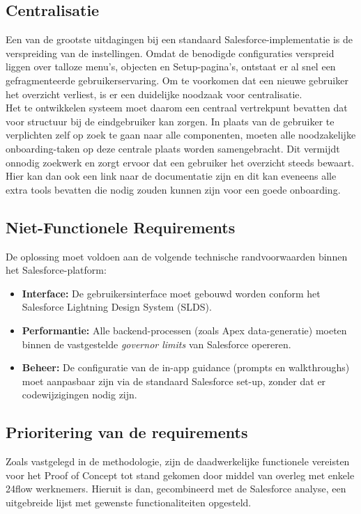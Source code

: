 \subsection{Centralisatie}
\label{subsec:centralisatie_dashboard}
Een van de grootste uitdagingen bij een standaard Salesforce-implementatie is de verspreiding van de instellingen. Omdat de benodigde configuraties verspreid liggen over talloze menu's, objecten en Setup-pagina's, ontstaat er al snel een gefragmenteerde gebruikerservaring. Om te voorkomen dat een nieuwe gebruiker het overzicht verliest, is er een duidelijke noodzaak voor centralisatie. 
\\

Het te ontwikkelen systeem moet daarom een centraal vertrekpunt bevatten dat voor structuur bij de eindgebruiker kan zorgen. In plaats van de gebruiker te verplichten zelf op zoek te gaan naar alle componenten, moeten alle noodzakelijke onboarding-taken op deze centrale plaats worden samengebracht. Dit vermijdt onnodig zoekwerk en zorgt ervoor dat een gebruiker het overzicht steeds bewaart. Hier kan dan ook een link naar de documentatie zijn en dit kan eveneens alle extra tools bevatten die nodig zouden kunnen zijn voor een goede onboarding.

\subsection{Niet-Functionele Requirements}
De oplossing moet voldoen aan de volgende technische randvoorwaarden binnen het Salesforce-platform:

\begin{itemize}
	\item \textbf{Interface:} De gebruikersinterface moet gebouwd worden conform het Salesforce Lightning Design System (SLDS).
	\item \textbf{Performantie:} Alle backend-processen (zoals Apex data-generatie) moeten binnen de vastgestelde \textit{governor limits} van Salesforce opereren.
	\item \textbf{Beheer:} De configuratie van de in-app guidance (prompts en walkthroughs) moet aanpasbaar zijn via de standaard Salesforce set-up, zonder dat er codewijzigingen nodig zijn.
\end{itemize}

\subsection{Prioritering van de requirements}
Zoals vastgelegd in de methodologie, zijn de daadwerkelijke functionele vereisten voor het Proof of Concept tot stand gekomen door middel van overleg met enkele 24flow werknemers. Hieruit is dan, gecombineerd met de Salesforce analyse, een uitgebreide lijst met gewenste functionaliteiten opgesteld. 
\\

